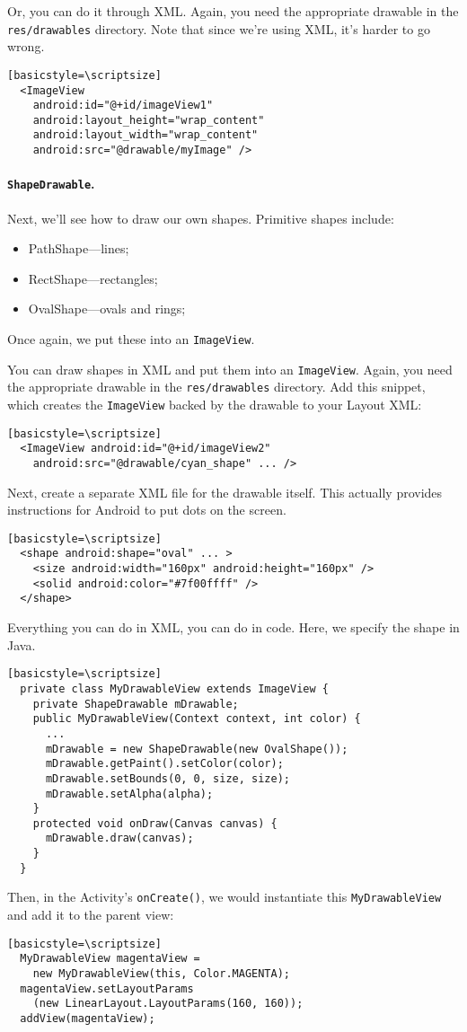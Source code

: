 Or, you can do it through XML. Again, you need the appropriate
drawable in the {\tt res/drawables} directory. Note that since we're
using XML, it's harder to go wrong.

\begin{verbatim}[basicstyle=\scriptsize]
  <ImageView
    android:id="@+id/imageView1"
    android:layout_height="wrap_content"
    android:layout_width="wrap_content"
    android:src="@drawable/myImage" />
\end{verbatim}

\paragraph{{\tt ShapeDrawable}.} Next, we'll see how to draw our own shapes.
Primitive shapes include:
\begin{itemize}
\item PathShape---lines;
\item RectShape---rectangles;
\item OvalShape---ovals and rings;
\end{itemize}
Once again, we put these into an {\tt ImageView}.

You can draw shapes in XML and put them into an {\tt ImageView}.
Again, you need the appropriate drawable in the {\tt res/drawables}
directory.  Add this snippet, which creates the {\tt ImageView} backed
by the drawable to your Layout XML:
\begin{verbatim}[basicstyle=\scriptsize]
  <ImageView android:id="@+id/imageView2"
    android:src="@drawable/cyan_shape" ... />
\end{verbatim}
Next, create a separate XML file for the drawable itself. This actually
provides instructions for Android to put dots on the screen.
\begin{verbatim}[basicstyle=\scriptsize]
  <shape android:shape="oval" ... >
    <size android:width="160px" android:height="160px" />
    <solid android:color="#7f00ffff" />
  </shape>
\end{verbatim}

Everything you can do in XML, you can do in code. Here, we
specify the shape in Java.
\begin{verbatim}[basicstyle=\scriptsize]
  private class MyDrawableView extends ImageView {
    private ShapeDrawable mDrawable;
    public MyDrawableView(Context context, int color) {
      ...
      mDrawable = new ShapeDrawable(new OvalShape());
      mDrawable.getPaint().setColor(color);
      mDrawable.setBounds(0, 0, size, size);
      mDrawable.setAlpha(alpha);
    }
    protected void onDraw(Canvas canvas) {
      mDrawable.draw(canvas);
    }
  }
\end{verbatim}
Then, in the Activity's {\tt onCreate()}, we would instantiate
this {\tt MyDrawableView} and add it to the parent view:
\begin{verbatim}[basicstyle=\scriptsize]
  MyDrawableView magentaView = 
    new MyDrawableView(this, Color.MAGENTA);
  magentaView.setLayoutParams
    (new LinearLayout.LayoutParams(160, 160));
  addView(magentaView);
\end{verbatim}




